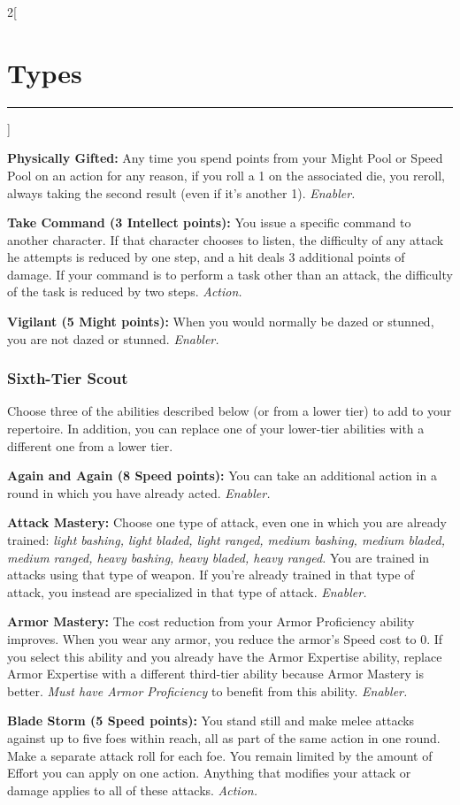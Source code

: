 \documentclass[a4paper,10pt,final]{book}
\newcommand{\HRule}{\rule{\linewidth}{0.5mm}} %
\newcommand{\newSection}[1]{\section*{#1} \addcontentsline{toc}{section}{#1} \label{sec:#1} \HRule}
\newcommand{\itemAbility}[2]{\textcolor{25gray}{\textbullet\textbf{ #1:}} {#2}\par}
\newcommand{\enabler}{\textit{ Enabler.}}
\newcommand{\action}{\textit{ Action.}}
\newenvironment{docsection}[1]
{
  \begin{multicols*}{2}[\newSection{#1}]
}
{
  \end{multicols*}
  \newpage
}
\begin{document}
\begin{docsection}{Types}
\itemAbility{Physically Gifted}{Any time you spend points from your Might Pool or Speed Pool on an action for any reason, if you roll a 1 on the associated die, you reroll, always taking the second result (even if it’s another 1).\enabler}

\itemAbility{Take Command (3 Intellect points)}{You issue a specific command to another character. If that character chooses to listen, the difficulty of any attack he attempts is reduced by one step, and a hit deals 3 additional points of damage. If your command is to perform a task other than an attack, the difficulty of the task is reduced by two steps.\action}

\itemAbility{Vigilant (5 Might points)}{When you would normally be dazed or stunned, you are not dazed or stunned.\enabler}


\subsubsection*{Sixth-Tier Scout}
\label{subsub:scoutSixthTier}

Choose three of the abilities described
below (or from a lower tier) to add to your
repertoire. In addition, you can replace one
of your lower-tier abilities with a different
one from a lower tier.

\itemAbility{Again and Again (8 Speed points)}{You can take an additional action in a round in which you have already acted.\enabler}

\itemAbility{Attack Mastery}{Choose one type of attack, even one in which you are already trained: \textit{light bashing, light bladed, light ranged, medium bashing, medium bladed, medium ranged, heavy bashing, heavy bladed, heavy ranged.} You are trained in attacks using that type of weapon. If you’re already trained in that type of attack, you instead are specialized in that type of attack.\enabler}

\itemAbility{Armor Mastery}{The cost reduction from your Armor Proficiency ability improves. When you wear any armor, you reduce the armor’s Speed cost to 0. If you select this ability and you already have the Armor Expertise ability, replace Armor Expertise with a different third-tier ability because Armor Mastery is better. \textit{Must have Armor Proficiency} to benefit from this ability.\enabler}

\itemAbility{Blade Storm (5 Speed points)}{You stand still and make melee attacks against up to five foes within reach, all as part of the same action in one round. Make a separate attack roll for each foe. You remain limited by the amount of Effort you can apply on one action. Anything that modifies your attack or damage applies to all of these attacks.\action}


\end{docsection}
\end{document}
